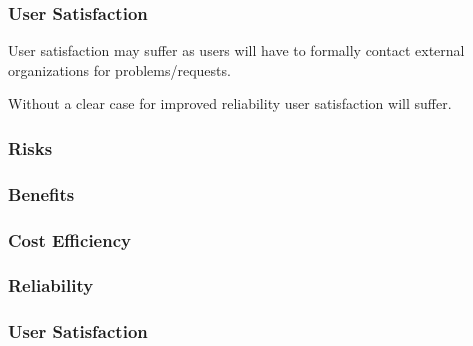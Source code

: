 \documentclass[12pt,a4paper]{article}
\begin{document}
\subsubsection*{User Satisfaction}
\bitm
\item User satisfaction may suffer as \EC users will have to formally contact external organizations for problems/requests.
  \item Without a clear case for improved reliability user satisfaction will suffer.
\eitm

\subsubsection*{Risks}
\bitm
\item 
\eitm

\subsubsection*{Benefits}
\bitm
\item 
\eitm

\subsubsection*{Cost Efficiency}
\bitm
\item 
\eitm

\subsubsection*{Reliability}
\bitm
\item 
\eitm

\subsubsection*{User Satisfaction}
\bitm
\item 
\eitm
\newpage
{}

\end{document}
